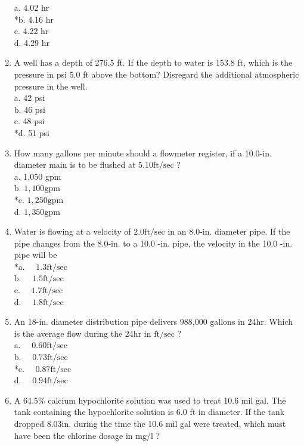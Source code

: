 \begin{enumerate}
\begin{itemize}
  \end{itemize}
a. 4.02 hr\\
*b. 4.16 hr\\
c. 4.22 hr\\
d. 4.29 hr\\
  \item A well has a depth of 276.5 ft. If the depth to water is 153.8 ft, which is the pressure in psi 5.0 ft above the bottom? Disregard the additional atmospheric pressure in the well.\\
a. 42 psi\\
b. 46 psi\\
c. 48 psi\\
*d. 51 psi\\
  \item How many gallons per minute should a flowmeter register, if a 10.0-in. diameter main is to be flushed at $5.10 \mathrm{ft} / \mathrm{sec}$ ?\\
a. 1,050 gpm\\
b. $1,100 \mathrm{gpm}$\\
*c. $1,250 \mathrm{gpm}$\\
d. $1,350 \mathrm{gpm}$\\
  \item Water is flowing at a velocity of $2.0 \mathrm{ft} / \mathrm{sec}$ in an 8.0-in. diameter pipe. If the pipe changes from the 8.0-in. to a 10.0 -in. pipe, the velocity in the 10.0 -in. pipe will be\\
*a. $\quad 1.3 \mathrm{ft} / \mathrm{sec}$\\
b. $\quad 1.5 \mathrm{ft} / \mathrm{sec}$\\
c. $\quad 1.7 \mathrm{ft} / \mathrm{sec}$\\
d. $\quad 1.8 \mathrm{ft} / \mathrm{sec}$ \\
\item An 18-in. diameter distribution pipe delivers 988,000 gallons in $24 \mathrm{hr}$. Which is the average flow during the $24 \mathrm{hr}$ in $\mathrm{ft} / \mathrm{sec}$ ?\\
a. $\quad 0.60 \mathrm{ft} / \mathrm{sec}$\\
b. $\quad 0.73 \mathrm{ft} / \mathrm{sec}$\\
*c. $\quad 0.87 \mathrm{ft} / \mathrm{sec}$\\
d. $\quad 0.94 \mathrm{ft} / \mathrm{sec}$\\
  \item A $64.5 \%$ calcium hypochlorite solution was used to treat 10.6 mil gal. The tank containing the hypochlorite solution is 6.0 ft in diameter. If the tank dropped $8.03 \mathrm{in}$. during the time the 10.6 mil gal were treated, which must have been the chlorine dosage in mg/l ?\\

\end{enumerate}
